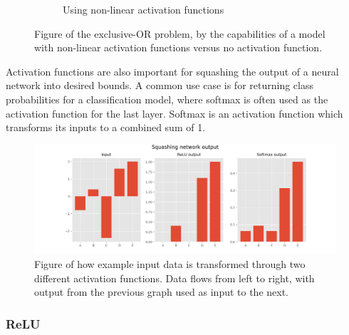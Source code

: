 \begin{figure}[H]
\begin{subfigure}{.45\textwidth}
        \caption{Using non-linear activation functions}%

    \end{subfigure}
    
    \caption{Figure of the exclusive-OR problem, by the capabilities of a model with non-linear activation functions versus no activation function.}
    \label{fig:exclusive-OR problem}
\end{figure}

Activation functions are also important for squashing the output of a neural network into desired bounds. A common use case is for returning class probabilities for a classification model, where softmax is often used as the activation function for the last layer. Softmax is an activation function which transforms its inputs to a combined sum of 1. \cite{sharma_understanding_2018}

\begin{figure}[H]
  \centering
    \includegraphics[width=\textwidth]{Assets/Chapter2_Theory/squashin_output_data_using_activation_functions.png}
    \caption{Figure of how example input data is transformed through two different activation functions. Data flows from left to right, with output from the previous graph used as input to the next.}
\end{figure}

\subsubsection{ReLU}

